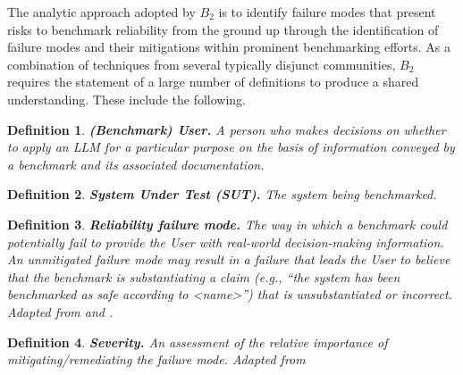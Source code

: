 \documentclass{article}
\newtheorem{dfn}{Definition}[section]
\newcommand\bb{$B_2$ }
\begin{document}
The analytic approach adopted by \bb is to identify failure modes that present risks to benchmark reliability from the ground up through the identification of failure modes and their mitigations within prominent benchmarking efforts. As a combination of techniques from several typically disjunct communities, \bb requires the statement of a large number of definitions to produce a shared understanding. These include the following.

\begin{dfn}
{\bf (Benchmark) User.} A person who makes decisions on whether to apply an LLM for a particular purpose on the basis of information conveyed by a benchmark and its associated documentation.
\end{dfn}
\begin{dfn}
{\bf System Under Test (SUT).} The system being benchmarked.
\end{dfn}
\begin{dfn}
{\bf Reliability failure mode.} The way in which a benchmark could potentially fail to provide the User with real-world decision-making information.  An unmitigated failure mode may result in a failure that leads the User to believe that the benchmark is substantiating a claim (e.g., ``the system has been benchmarked as safe according to <name>'') that is unsubstantiated or incorrect. Adapted from \cite{cnssi4009} and \cite{Rausand2004}.
\end{dfn}
\begin{dfn}
{\bf Severity.} An assessment of the relative importance of mitigating/remediating the failure mode.  Adapted from \cite{nist80030r1}
\end{dfn}
\end{document}
